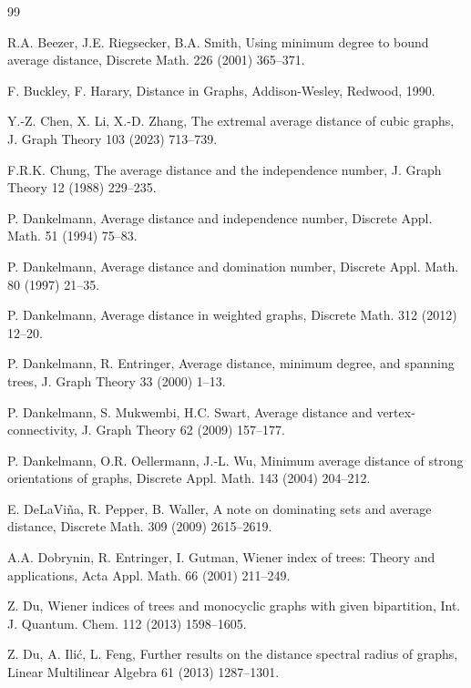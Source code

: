 \documentclass[12pt]{article}
\begin{document}
\begin{thebibliography}{99}



R.A. Beezer, J.E. Riegsecker, B.A. Smith, Using minimum degree to bound average distance, Discrete Math. 226 (2001) 365--371.


F. Buckley, F. Harary, Distance in Graphs, Addison-Wesley, Redwood, 1990.

Y.-Z. Chen, X. Li, X.-D. Zhang, The extremal average distance of cubic graphs, J. Graph Theory 103 (2023) 713--739.

F.R.K. Chung, The average distance and the independence number, J. Graph Theory 12 (1988) 229--235.

P. Dankelmann, Average distance and independence number,
Discrete Appl. Math. 51 (1994) 75--83.


P. Dankelmann, Average distance and domination number,
Discrete Appl. Math. 80 (1997) 21--35.

P. Dankelmann, Average distance in weighted graphs, Discrete Math. 312 (2012) 12--20.

P. Dankelmann, R. Entringer, Average distance, minimum degree, and spanning trees, J. Graph Theory 33 (2000) 1--13.

P. Dankelmann, S. Mukwembi, H.C. Swart, Average distance and vertex-connectivity, J. Graph Theory 62 (2009) 157--177.



P. Dankelmann, O.R. Oellermann, J.-L. Wu, Minimum average distance of strong orientations of graphs, Discrete Appl. Math. 143 (2004) 204--212.

E. DeLaVi{\~ n}a, R. Pepper, B. Waller, A note on dominating sets and average distance, Discrete Math. 309 (2009) 2615--2619.

A.A. Dobrynin, R. Entringer, I. Gutman, Wiener index
of trees: Theory and applications, Acta Appl. Math. 66 (2001)
211--249.



Z. Du, Wiener indices of trees and monocyclic
graphs with given bipartition, Int. J. Quantum. Chem. 112 (2013) 1598--1605.

Z. Du, A. Ili{\' c}, L. Feng, Further results on the distance spectral
radius of graphs, Linear Multilinear Algebra 61 (2013) 1287--1301.


\end{thebibliography}
\end{document}
